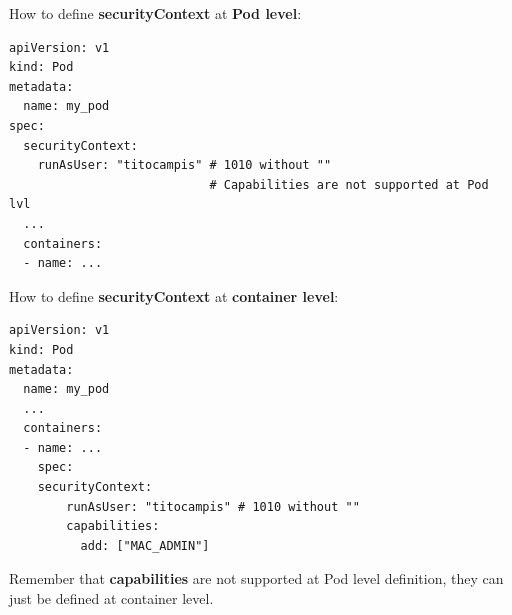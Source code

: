 \documentclass{article}
\newenvironment{blocktemplateIII}[1]{%
    \tcolorbox[beamer,%
    noparskip,breakable,
    ,colframe=Red,%
    colbacklower=LimeGreen!75!LightGreen,%
    title=#1]}%
    {\endtcolorbox}
\newenvironment{codetemplate}[1][]{%
  \mybasecolorbox[#1]
  \itshape
}{%
  \endmybasecolorbox
}
\begin{document}
How to define \textbf{securityContext} at \textbf{Pod level}:
\begin{codetemplate}{}
\begin{verbatim}
apiVersion: v1
kind: Pod
metadata:
  name: my_pod
spec:
  securityContext:
    runAsUser: "titocampis" # 1010 without ""
                            # Capabilities are not supported at Pod lvl
  ...
  containers:
  - name: ...
\end{verbatim}
\end{codetemplate}

How to define \textbf{securityContext} at \textbf{container level}:
\begin{codetemplate}{}
\begin{verbatim}
apiVersion: v1
kind: Pod
metadata:
  name: my_pod
  ...
  containers:
  - name: ...
    spec:
    securityContext:
        runAsUser: "titocampis" # 1010 without ""
        capabilities:
          add: ["MAC_ADMIN"]
\end{verbatim}
\end{codetemplate}

\begin{blocktemplateIII}{WARNING}
Remember that \textbf{capabilities} are not supported at Pod level definition, they can just be defined at container level.
\end{blocktemplateIII}
\end{document}

